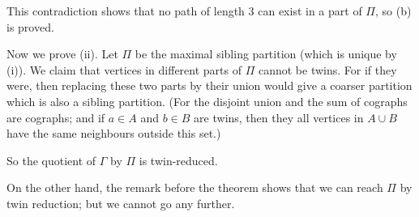 \documentclass[10pt,a4paper]{amsart}
\newenvironment{proof}{\prepf\rm}{\endprepf}
\begin{document}
\begin{proof}
This contradiction shows that no path of length $3$ can exist in a part of
$\Pi$, so (b) is proved.

\medskip

Now we prove (ii). Let $\Pi$ be the maximal sibling partition (which is unique
by (i)). We claim that vertices
in different parts of $\Pi$ cannot be twins. For if they were, then replacing
these two parts by their union would give a coarser partition which is also a
sibling partition. (For the disjoint union and the sum of cographs are cographs;
and if $a\in A$ and $b\in B$ are twins, then they all vertices in $A\cup B$
have the same neighbours outside this set.)

So the quotient of $\Gamma$ by $\Pi$ is twin-reduced.

On the other hand, the remark before the theorem shows that we can reach $\Pi$
by twin reduction; but we cannot go any further.
\end{proof}
\end{document}
